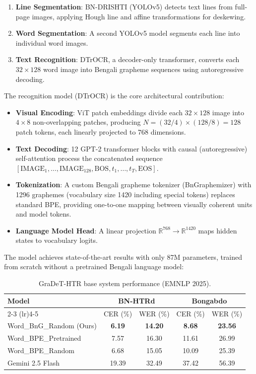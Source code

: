 \documentclass[11pt, a4paper]{report}
\begin{document}
\begin{enumerate}[leftmargin=2em]
  \item \textbf{Line Segmentation}: BN-DRISHTI (YOLOv5) detects text lines from full-page images, applying Hough line and affine transformations for deskewing.
  \item \textbf{Word Segmentation}: A second YOLOv5 model segments each line into individual word images.
  \item \textbf{Text Recognition}: DTrOCR, a decoder-only transformer, converts each $32 \times 128$ word image into Bengali grapheme sequences using autoregressive decoding.
\end{enumerate}

\noindent The recognition model (DTrOCR) is the core architectural contribution:
\begin{itemize}[leftmargin=2em]
  \item \textbf{Visual Encoding}: ViT patch embeddings divide each $32 \times 128$ image into $4 \times 8$ non-overlapping patches, producing $N = (32/4) \times (128/8) = 128$ patch tokens, each linearly projected to 768 dimensions.
  \item \textbf{Text Decoding}: 12 GPT-2 transformer blocks with causal (autoregressive) self-attention process the concatenated sequence $[\text{IMAGE}_1, \ldots, \text{IMAGE}_{128}, \text{BOS}, t_1, \ldots, t_T, \text{EOS}]$.
  \item \textbf{Tokenization}: A custom Bengali grapheme tokenizer (BnGraphemizer) with 1296 graphemes (vocabulary size 1420 including special tokens) replaces standard BPE, providing one-to-one mapping between visually coherent units and model tokens.
  \item \textbf{Language Model Head}: A linear projection $\mathbb{R}^{768} \to \mathbb{R}^{1420}$ maps hidden states to vocabulary logits.
\end{itemize}

\noindent The model achieves state-of-the-art results with only 87M parameters, trained from scratch without a pretrained Bengali language model:

\begin{table}[h]
\centering
\caption{GraDeT-HTR base system performance (EMNLP 2025).}
\label{tab:base-results}
\begin{tabular}{lcccc}
\toprule
\multirow{2}{*}{\textbf{Model}} & \multicolumn{2}{c}{\textbf{BN-HTRd}} & \multicolumn{2}{c}{\textbf{Bongabdo}} \\
\cmidrule(lr){2-3} \cmidrule(lr){4-5}
& CER (\%) & WER (\%) & CER (\%) & WER (\%) \\
\midrule
Word\_BnG\_Random (Ours) & \textbf{6.19} & \textbf{14.20} & \textbf{8.68} & \textbf{23.56} \\
Word\_BPE\_Pretrained & 7.57 & 16.30 & 11.61 & 26.99 \\
Word\_BPE\_Random & 6.68 & 15.05 & 10.09 & 25.39 \\
Gemini 2.5 Flash & 19.39 & 32.49 & 37.42 & 56.39 \\
\bottomrule
\end{tabular}
\end{table}
\end{document}
